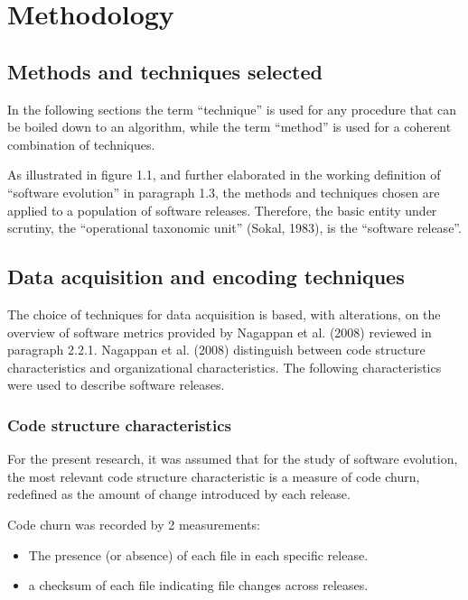 
\chapter{Methodology} %

\label{Chapter3} %


\section{Methods and techniques selected}
In the following sections the term “technique” is used for any procedure that can be boiled down to an algorithm, while the term “method” is used for a coherent combination of techniques.

As illustrated in figure 1.1, and further elaborated in the working definition of “software evolution” in paragraph 1.3, the methods and techniques chosen are applied to a population of software releases. Therefore, the basic entity under scrutiny, the “operational taxonomic unit” (Sokal, 1983), is the “software release”.

\section{Data acquisition and encoding techniques}

The choice of techniques for data acquisition is based, with alterations, on the overview of software metrics provided by Nagappan et al. (2008) reviewed in paragraph 2.2.1. Nagappan et al. (2008) distinguish between code structure characteristics and organizational characteristics. The following characteristics were used to describe software releases.

\subsection{Code structure characteristics}
For the present research, it was assumed that for the study of software evolution, the most relevant code structure characteristic is a measure of code churn, redefined as the amount of change introduced by each release.

\noindent
Code churn was recorded by 2 measurements: 
\begin{itemize}
\item{The presence (or absence) of each file in each specific release.}
\item{a checksum of each file indicating file changes across releases.}
\end{itemize}

